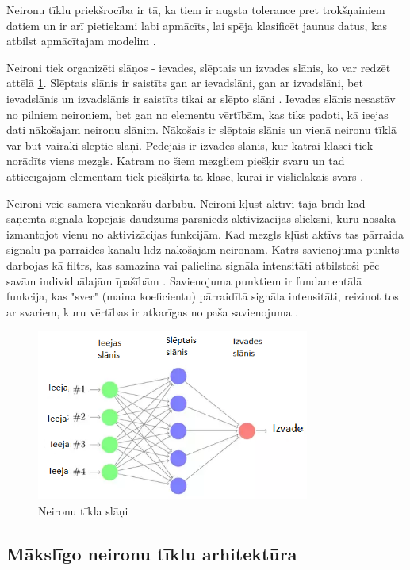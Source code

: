 \documentclass[12pt,paper=A4]{report}
\begin{document}
Neironu tīklu priekšrocība ir tā, ka tiem ir augsta tolerance pret trokšņainiem datiem un ir arī pietiekami labi apmācīts, lai spēja klasificēt jaunus datus, kas atbilst apmācītajam modelim \cite{neirons}.

Neironi tiek organizēti slāņos - ievades, slēptais
un izvades slānis, ko var redzēt attēlā \ref{neiro}. Slēptais slānis ir saistīts gan ar
ievadslāni, gan ar izvadslāni, bet ievadslānis un izvadslānis ir saistīts tikai ar slēpto slāni \cite{dtw18}.
Ievades slānis nesastāv no pilniem neironiem, bet 
gan no elementu vērtībām, kas tiks padoti, kā ieejas 
dati nākošajam neironu slānim. Nākošais ir slēptais 
slānis un vienā neironu tīklā var būt vairāki 
slēptie slāņi. Pēdējais ir izvades slānis, kur 
katrai klasei tiek norādīts viens mezgls.
Katram no šiem mezgliem 
piešķir svaru un tad attiecīgajam elementam tiek 
piešķirta tā klase, kurai ir 
vislielākais svars \cite{neirons}.



Neironi veic samērā vienkāršu darbību. 
Neironi kļūst aktīvi tajā brīdī kad saņemtā signāla
kopējais daudzums pārsniedz aktivizācijas slieksni,
kuru nosaka izmantojot vienu no aktivizācijas
funkcijām. 
Kad mezgls kļūst aktīvs tas pārraida signālu pa pārraides
kanālu līdz nākošajam neironam. Katrs savienojuma 
punkts darbojas kā filtrs, kas samazina vai palielina
signāla intensitāti atbilstoši pēc savām 
individuālajām īpašībām \cite{dtw18}.
Savienojuma punktiem ir fundamentālā funkcija, kas "sver" (maina koeficientu) pārraidītā signāla 
intensitāti, reizinot tos ar svariem, kuru vērtības ir atkarīgas 
no paša savienojuma \cite{dtw18}. 
\begin{figure}[H] \centering
\includegraphics[width=0.80\textwidth]{layers} 
\caption{Neironu tīkla slāņi \cite{layers}}  \label{neiro} 
\end{figure}

\subsection{Mākslīgo neironu tīklu arhitektūra}
\end{document}
